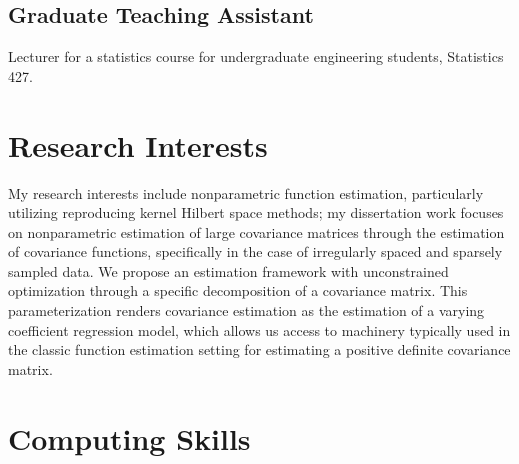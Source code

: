 \documentclass[11pt,a4paper]{moderncv}
\begin{document}
\subsection{Graduate Teaching Assistant}
 {Lecturer for a statistics course for undergraduate engineering students, Statistics 427.}

\section{Research Interests}
My research interests include nonparametric function estimation, particularly utilizing reproducing kernel Hilbert space methods; my dissertation work focuses on nonparametric estimation of large covariance matrices through the estimation of covariance functions, specifically in the case of irregularly spaced and sparsely sampled data. We propose an estimation framework with unconstrained optimization through a specific decomposition of a covariance matrix. This parameterization renders covariance estimation as the estimation of a varying coefficient regression model, which allows us access to machinery typically used in the classic function estimation setting for estimating a positive definite covariance matrix.


\section{Computing Skills} 
\end{document}
